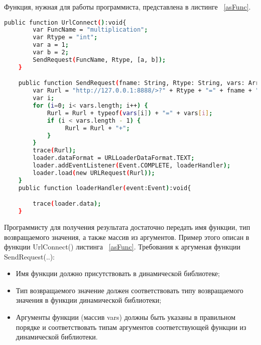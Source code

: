 Функция, нужная для работы программиста, представлена в листинге ~\ref{asFunc}.
\begin{lstlisting}[frame=shadowbox, language=bash,   emph={forsuffixes,text,bpath},emphstyle={\color{red}},
   emph={[2]fill,unfill},emphstyle={[2]\bfseries\underbar}, caption=Функция для Flash-приложения, label=asFunc]
    public function UrlConnect():void{
        var FuncName = "multiplication";
        var Rtype = "int";
        var a = 1;
        var b = 2;
        SendRequest(FuncName, Rtype, [a, b]);
    }

    public function SendRequest(fname: String, Rtype: String, vars: Array){
        var Rurl = "http://127.0.0.1:8888/>?" + Rtype + "=" + fname + "+";
        var i;
        for (i=0; i< vars.length; i++) {
            Rurl = Rurl + typeof(vars[i]) + "=" + vars[i];
            if (i < vars.length - 1) {
                 Rurl = Rurl + "+";
            }
        }
        trace(Rurl);
        loader.dataFormat = URLLoaderDataFormat.TEXT;
        loader.addEventListener(Event.COMPLETE, loaderHandler);
        loader.load(new URLRequest(Rurl));
    }
    public function loaderHandler(event:Event):void{

        trace(loader.data);
    }
\end{lstlisting}
Программисту для получения результата достаточно передать имя функции, тип возвращаемого значения, а также массив из аргументов. Пример этого описан в функции UrlConnect() листинга ~\ref{asFunc}. Требования к аргуменая функции SendRequest(..):
\begin{itemize}
	\item Имя функции должно присутствовать в динамической библиотеке;
	\item Тип возвращаемого значение должен соответствовать типу возвращаемого значения в функции динамической библиотеки;
	\item Аргументы функции (массив vars) должны быть указаны в правильном порядке и соответствовать типам аргументов соответствующей функции из динамической библиотеки.
\end{itemize}


